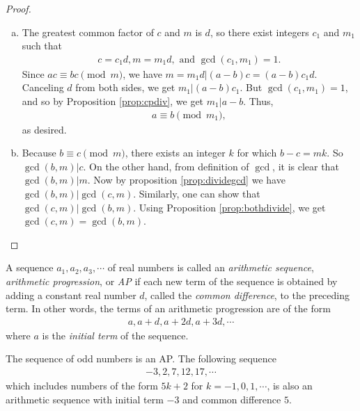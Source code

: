 \documentclass{subfile}
\begin{document}
	\begin{proof}
		$ $
		\begin{enumerate}[(a)]
			\item The greatest common factor of $c$ and $m$ is $d$, so  there exist integers $c_1$ and $m_1$ such that
				\begin{align*}
				 c=c_1d, m = m_1 d, \text{ and } \gcd(c_1,m_1) = 1.
				\end{align*}
			Since $ac \equiv bc \pmod m$, we have $m=m_1d|(a-b)c=(a-b)c_1d$. Canceling $d$ from both sides, we get $m_1 | (a-b)c_1$. But $\gcd(c_1,m_1)=1$, and so by Proposition \ref{prop:cpdiv}, we get $m_1|a-b$. Thus,
				\begin{align*} 
				a \equiv b \pmod{m_1},
				\end{align*}
			as desired.
			
			\item Because $b \equiv c \pmod m$, there exists an integer $k$ for which $b-c=mk$. So $\gcd(b,m)|c$. On the other hand, from definition of $\gcd$, it is clear that $\gcd(b,m)|m$. Now by proposition \ref{prop:dividegcd} we have $\gcd(b,m)|\gcd(c,m)$. Similarly, one can show that $\gcd(c,m)|\gcd(b,m)$. Using Proposition \ref{prop:bothdivide}, we get $\gcd(c,m)=\gcd(b,m)$. 
		\end{enumerate}
	\end{proof}
	
	\begin{definition}\label{def:AP}
		A sequence $a_1, a_2, a_3, \cdots$ of real numbers is called an \textit{arithmetic sequence}, \textit{arithmetic progression}, or \textit{AP} if each new term of the sequence is obtained by adding a constant real number $d$, called the \textit{common difference}, to the preceding term. In other words, the terms of an arithmetic progression are of the form
			\begin{align*}
				a, a+d, a+2d, a+3d, \cdots
			\end{align*}
		where $a$ is the \textit{initial term} of the sequence.
	\end{definition}
	
	\begin{example}
		The sequence of odd numbers is an AP. The following sequence
			\begin{align*}
				-3, 2, 7, 12, 17, \cdots
			\end{align*}
		which includes numbers of the form $5k+2$ for $k=-1,0,1,\cdots$, is also an arithmetic sequence with initial term $-3$ and common difference $5$.
	\end{example}
	
\end{document}

